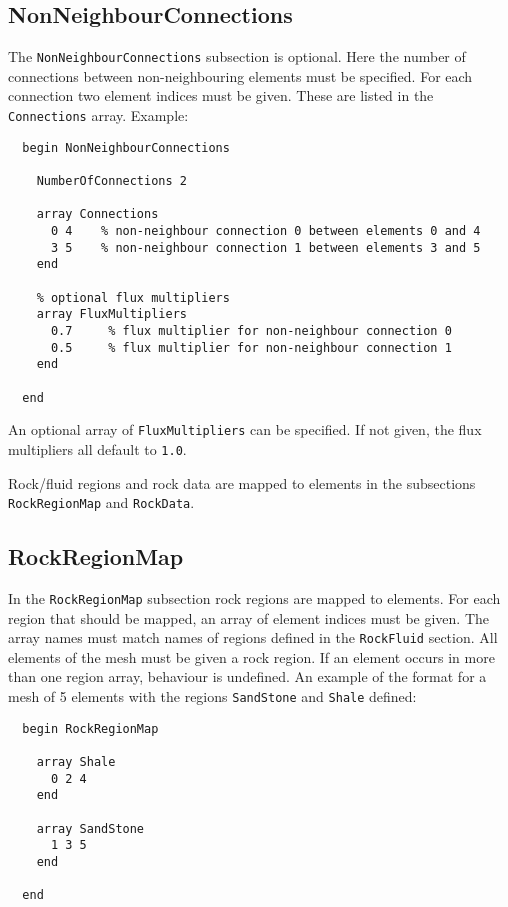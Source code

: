 \subsection{NonNeighbourConnections}
\label{sec:non-neigh-connections}
The \texttt{NonNeighbourConnections} subsection is optional. Here the
number of connections between non-neighbouring elements must be
specified. For each connection two element indices must be given.
These are listed in the \texttt{Connections} array. Example:
%
\begin{verbatim}
  begin NonNeighbourConnections

    NumberOfConnections 2

    array Connections
      0 4    % non-neighbour connection 0 between elements 0 and 4
      3 5    % non-neighbour connection 1 between elements 3 and 5
    end

    % optional flux multipliers
    array FluxMultipliers
      0.7     % flux multiplier for non-neighbour connection 0
      0.5     % flux multiplier for non-neighbour connection 1
    end

  end
\end{verbatim}
%
An optional array of \texttt{FluxMultipliers} can be specified. If not
given, the flux multipliers all default to \texttt{1.0}.




\label{sec:data-mapping}

Rock/fluid regions and rock data are mapped to elements in the
subsections \texttt{RockRegionMap} and \texttt{RockData}.

\subsection{RockRegionMap}
\label{sec:rockregionmap}
%
In the \texttt{RockRegionMap} subsection rock regions are mapped to
elements. For each region that should be mapped, an array of element
indices must be given. The array names must match names of regions
defined in the \texttt{RockFluid} section. All elements of the mesh
must be given a rock region. If an element occurs in more than one
region array, behaviour is undefined. An example of the format for a
mesh of 5 elements with the regions \texttt{SandStone} and
\texttt{Shale} defined:
%
\begin{verbatim}
  begin RockRegionMap
 
    array Shale
      0 2 4
    end

    array SandStone
      1 3 5
    end

  end
\end{verbatim}



